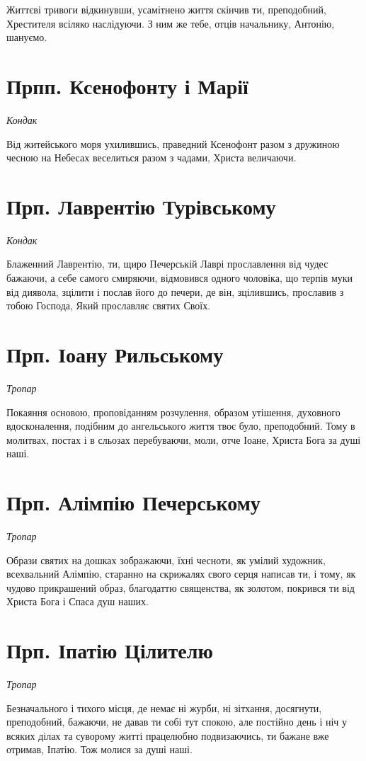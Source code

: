 \documentclass[chapters.tex]{subfiles}
\begin{document}
Життєві тривоги відкинувши, усамітнено життя скінчив ти, преподобний, Хрестителя всіляко наслідуючи. З ним же тебе, отців начальнику, Антонію, шануємо.

\section{Прпп. Ксенофонту і Марії}
\emph{Кондак}

Від житейського моря ухилившись, праведний Ксенофонт разом з дружиною чесною на Небесах веселиться разом з чадами, Христа величаючи.

\section{Прп. Лаврентію Турівському}
\emph{Кондак}

Блаженний Лаврентію, ти, щиро Печерській Лаврі прославлення від чудес бажаючи, а себе самого смиряючи, відмовився одного чоловіка, що терпів муки від диявола, зцілити і послав його до печери, де він, зцілившись, прославив з тобою Господа, Який прославляє святих Своїх.

\section{Прп. Іоану Рильському}
\emph{Тропар}

Покаяння основою, проповіданням розчулення, образом утішення, духовного вдосконалення, подібним до ангельського життя твоє було, преподобний. Тому в молитвах, постах і в сльозах перебуваючи, моли, отче Іоане, Христа Бога за душі наші.

\section{Прп. Алімпію Печерському}
\emph{Тропар}

Образи святих на дошках зображаючи, їхні чесноти, як умілий художник, всехвальний Алімпію, старанно на скрижалях свого серця написав ти, і тому, як чудово прикрашений образ, благодаттю священства, як золотом, покрився ти від Христа Бога і Спаса душ наших.

\section{Прп. Іпатію Цілителю}
\emph{Тропар}

Безначального і тихого місця, де немає ні журби, ні зітхання, досягнути, преподобний, бажаючи, не давав ти собі тут спокою, але постійно день і ніч у всяких ділах та суворому житті працелюбно подвизаючись, ти бажане вже отримав, Іпатію. Тож молися за душі наші.
\end{document}

